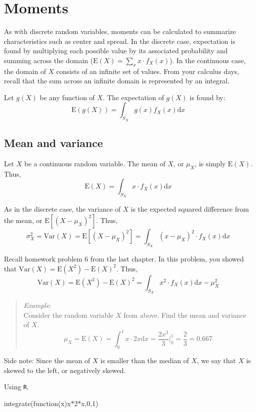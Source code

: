 \documentclass[
  letterpaper,
  DIV=11,
  numbers=noendperiod]{scrreprt}
\newenvironment{Shaded}{\begin{snugshade}}{\end{snugshade}}
\newcommand{\ControlFlowTok}[1]{\textcolor[rgb]{0.00,0.23,0.31}{#1}}
\newcommand{\DecValTok}[1]{\textcolor[rgb]{0.68,0.00,0.00}{#1}}
\newcommand{\FunctionTok}[1]{\textcolor[rgb]{0.28,0.35,0.67}{#1}}
\newcommand{\NormalTok}[1]{\textcolor[rgb]{0.00,0.23,0.31}{#1}}
\newcommand{\SpecialCharTok}[1]{\textcolor[rgb]{0.37,0.37,0.37}{#1}}
\begin{document}
\section{Moments}\label{moments-1}

As with discrete random variables, moments can be calculated to
summarize characteristics such as center and spread. In the discrete
case, expectation is found by multiplying each possible value by its
associated probability and summing across the domain
(\(\mbox{E}(X)=\sum_x x\cdot f_X(x)\)). In the continuous case, the
domain of \(X\) consists of an infinite set of values. From your
calculus days, recall that the sum across an infinite domain is
represented by an integral.

Let \(g(X)\) be any function of \(X\). The expectation of \(g(X)\) is
found by: \[
\mbox{E}(g(X)) = \int_{S_X} g(x)f_X(x)\mbox{d}x
\]

\subsection{Mean and variance}\label{mean-and-variance}

Let \(X\) be a continuous random variable. The mean of \(X\), or
\(\mu_X\), is simply \(\mbox{E}(X)\). Thus, \[
\mbox{E}(X)=\int_{S_X}x\cdot f_X(x)\mbox{d}x
\]

As in the discrete case, the variance of \(X\) is the expected squared
difference from the mean, or \(\mbox{E}[(X-\mu_X)^2]\). Thus, \[
\sigma^2_X = \mbox{Var}(X)=\mbox{E}[(X-\mu_X)^2]= \int_{S_X} (x-\mu_X)^2\cdot f_X(x) \mbox{d}x
\]

Recall homework problem 6 from the last chapter. In this problem, you
showed that \(\mbox{Var}(X)=\mbox{E}(X^2)-\mbox{E}(X)^2\). Thus, \[
\mbox{Var}(X)=\mbox{E}(X^2)-\mbox{E}(X)^2 = \int_{S_X} x^2\cdot f_X(x)\mbox{d}x - \mu_X^2 
\]

\begin{quote}
\emph{Example}:\\
Consider the random variable \(X\) from above. Find the mean and
variance of \(X\). \[
\mu_X= \mbox{E}(X)=\int_0^1 x\cdot 2x\mbox{d}x = \frac{2x^3}{3}\bigg|_0^1 = \frac{2}{3}=0.667
\]
\end{quote}

Side note: Since the mean of \(X\) is smaller than the median of \(X\),
we say that \(X\) is skewed to the left, or negatively skewed.

Using \texttt{R}.

\begin{Shaded}
\begin{Highlighting}[]
\FunctionTok{integrate}\NormalTok{(}\ControlFlowTok{function}\NormalTok{(x)x}\SpecialCharTok{*}\DecValTok{2}\SpecialCharTok{*}\NormalTok{x,}\DecValTok{0}\NormalTok{,}\DecValTok{1}\NormalTok{)}
\end{Highlighting}
\end{Shaded}
\end{document}
